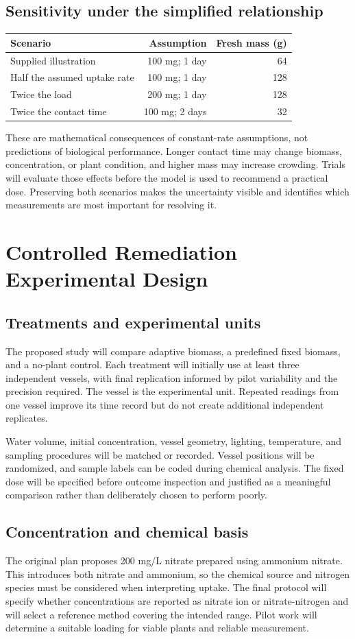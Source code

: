 \documentclass[12pt,a4paper]{article}
\newcommand{\papersection}[1]{\clearpage\section{#1}}
\begin{document}
\subsection{Sensitivity under the simplified relationship}
\begin{center}\small
\begin{tabular}{lrr}
\toprule Scenario & Assumption & Fresh mass (g)\\\midrule
Supplied illustration & 100 mg; 1 day & 64\\
Half the assumed uptake rate & 100 mg; 1 day & 128\\
Twice the load & 200 mg; 1 day & 128\\
Twice the contact time & 100 mg; 2 days & 32\\\bottomrule
\end{tabular}\end{center}
These are mathematical consequences of constant-rate assumptions, not predictions of biological performance. Longer contact time may change biomass, concentration, or plant condition, and higher mass may increase crowding. Trials will evaluate those effects before the model is used to recommend a practical dose. Preserving both scenarios makes the uncertainty visible and identifies which measurements are most important for resolving it.

\papersection{Controlled Remediation Experimental Design}
\subsection{Treatments and experimental units}
The proposed study will compare adaptive biomass, a predefined fixed biomass, and a no-plant control. Each treatment will initially use at least three independent vessels, with final replication informed by pilot variability and the precision required. The vessel is the experimental unit. Repeated readings from one vessel improve its time record but do not create additional independent replicates.

Water volume, initial concentration, vessel geometry, lighting, temperature, and sampling procedures will be matched or recorded. Vessel positions will be randomized, and sample labels can be coded during chemical analysis. The fixed dose will be specified before outcome inspection and justified as a meaningful comparison rather than deliberately chosen to perform poorly.

\subsection{Concentration and chemical basis}
The original plan proposes 200 mg/L nitrate prepared using ammonium nitrate. This introduces both nitrate and ammonium, so the chemical source and nitrogen species must be considered when interpreting uptake. The final protocol will specify whether concentrations are reported as nitrate ion or nitrate-nitrogen and will select a reference method covering the intended range. Pilot work will determine a suitable loading for viable plants and reliable measurement.
\end{document}
